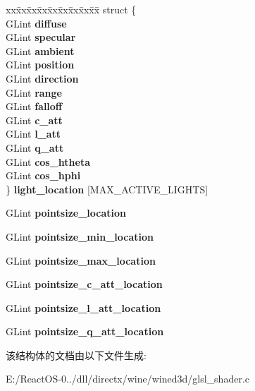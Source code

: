 \begin{DoxyCompactItemize}
\begin{tabbing}
xx\=xx\=xx\=xx\=xx\=xx\=xx\=xx\=xx\=\kill
struct \{\\
\>GLint {\bfseries diffuse}\\
\>GLint {\bfseries specular}\\
\>GLint {\bfseries ambient}\\
\>GLint {\bfseries position}\\
\>GLint {\bfseries direction}\\
\>GLint {\bfseries range}\\
\>GLint {\bfseries falloff}\\
\>GLint {\bfseries c\_att}\\
\>GLint {\bfseries l\_att}\\
\>GLint {\bfseries q\_att}\\
\>GLint {\bfseries cos\_htheta}\\
\>GLint {\bfseries cos\_hphi}\\
\} {\bfseries light\_location} \mbox{[}MAX\_ACTIVE\_LIGHTS\mbox{]}\\

\end{tabbing}\item 
\mbox{\label{structglsl__vs__program_a333b57d22b10728212f3ba53450b4dc6}} 
G\+Lint {\bfseries pointsize\+\_\+location}
\item 
\mbox{\label{structglsl__vs__program_ad92c47d5d8989199a6e05012c2750699}} 
G\+Lint {\bfseries pointsize\+\_\+min\+\_\+location}
\item 
\mbox{\label{structglsl__vs__program_a2635d69c39b431deba1f2ca16236d570}} 
G\+Lint {\bfseries pointsize\+\_\+max\+\_\+location}
\item 
\mbox{\label{structglsl__vs__program_adbd1585f4d9a153e0f6098a2bbc9e287}} 
G\+Lint {\bfseries pointsize\+\_\+c\+\_\+att\+\_\+location}
\item 
\mbox{\label{structglsl__vs__program_a30b39061fe1949cb60e5f13f196608f2}} 
G\+Lint {\bfseries pointsize\+\_\+l\+\_\+att\+\_\+location}
\item 
\mbox{\label{structglsl__vs__program_ab663e8cb99d068e02d0c62ab23462fff}} 
G\+Lint {\bfseries pointsize\+\_\+q\+\_\+att\+\_\+location}
\end{DoxyCompactItemize}


该结构体的文档由以下文件生成\+:\begin{DoxyCompactItemize}
\item 
E\+:/\+React\+O\+S-\/0../dll/directx/wine/wined3d/glsl\+\_\+shader.\+c\end{DoxyCompactItemize}
